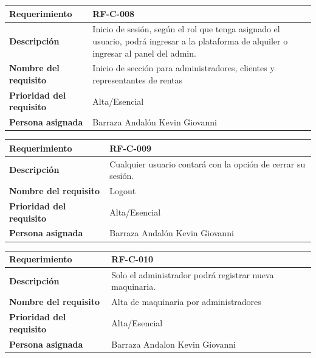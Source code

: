 \documentclass{article}
\begin{document}
\begin{center}
\begin{tabular}{|p{3cm}|p{9cm}|}
\hline
\textbf{Requerimiento} & RF-C-008 \\
\hline
\textbf{Descripción} & Inicio de sesión, según el rol que tenga asignado el usuario, podrá ingresar a la plataforma de alquiler o ingresar al panel del admin. \\
\hline
\textbf{Nombre del requisito} & Inicio de sección para administradores, clientes y representantes de rentas \\
\hline
\textbf{Prioridad del requisito} & Alta/Esencial \\
\hline
\textbf{Persona asignada} & Barraza Andalón Kevin Giovanni \\
\hline
\end{tabular}
\end{center}

\begin{center}
\begin{tabular}{|p{3cm}|p{9cm}|}
\hline
\textbf{Requerimiento} & RF-C-009 \\
\hline
\textbf{Descripción} & Cualquier usuario contará con la opción de cerrar su sesión. \\
\hline
\textbf{Nombre del requisito} & Logout \\
\hline
\textbf{Prioridad del requisito} & Alta/Esencial \\
\hline
\textbf{Persona asignada} & Barraza Andalón Kevin Giovanni \\
\hline
\end{tabular}
\end{center}

\begin{center}
\begin{tabular}{|p{3cm}|p{9cm}|}
\hline
\textbf{Requerimiento} & RF-C-010 \\
\hline
\textbf{Descripción} & Solo el administrador podrá registrar nueva maquinaria. \\
\hline
\textbf{Nombre del requisito} & Alta de maquinaria por administradores \\
\hline
\textbf{Prioridad del requisito} & Alta/Esencial \\
\hline
\textbf{Persona asignada} & Barraza Andalon Kevin Giovanni \\
\hline
\end{tabular}
\end{center}
\end{document}
